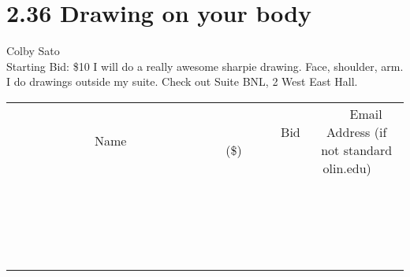 \documentclass[11pt]{article}
\begin{document}
\section*{2.36 Drawing on your body}
Colby Sato
\\
Starting Bid: \$10
\newline
I will do a really awesome sharpie drawing. Face, shoulder, arm. 
I do drawings outside my suite. 
Check out Suite BNL, 2 West East Hall.
\\[3ex]
\begin{tabular}{c c c}
~~~~~~~~~~~~~Name~~~~~~~~~~~~~ & ~~~~~~~~~Bid (\$)~~~~~~~~~  & ~~~Email Address (if not standard olin.edu)~~~\\
 & & \\
\hline
 & & \\
\hline
 & & \\
\hline
 & & \\
\hline
 & & \\
\hline
 & & \\
\hline
 & & \\
\hline
 & & \\
\hline
 & & \\
\hline
 & & \\
\hline
 & & \\
\hline
 & & \\
\hline
 & & \\
\hline
 & & \\
\hline
 & & \\
\hline
 & & \\
\hline
 & & \\
\hline
 & & \\
\hline
 & & \\
\hline
\end{tabular}
\newpage
\end{document}
